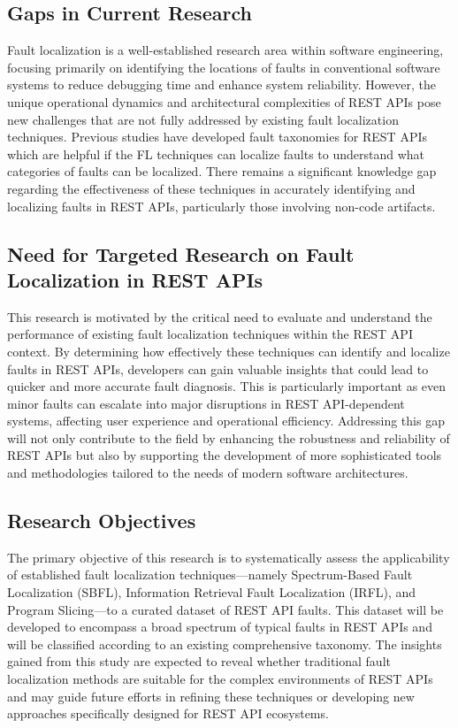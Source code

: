 \documentclass[conference]{IEEEtran}
\begin{document}
\subsection{Gaps in Current Research}
Fault localization is a well-established research area within software engineering, focusing primarily on identifying the locations of faults in conventional software systems to reduce debugging time and enhance system reliability.
 However, the unique operational dynamics and architectural complexities of REST APIs pose new challenges that are not fully addressed by existing fault localization techniques.
Previous studies have developed fault taxonomies for REST APIs which are helpful if the FL techniques can localize faults to understand what categories of faults can be localized.
There remains a significant knowledge gap regarding the effectiveness of these techniques in accurately identifying and localizing faults in REST APIs, particularly those involving non-code artifacts.


\subsection{Need for Targeted Research on Fault Localization in REST APIs}
This research is motivated by the critical need to evaluate and understand the performance of existing fault localization techniques within the REST API context. 
By determining how effectively these techniques can identify and localize faults in REST APIs, developers can gain valuable insights that could lead to quicker and more accurate fault diagnosis. This is particularly important as even minor faults can escalate into major disruptions in REST API-dependent systems, affecting user experience and operational efficiency. Addressing this gap will not only contribute to the field by enhancing the robustness and reliability of REST APIs but also by supporting the development of more sophisticated tools and methodologies tailored to the needs of modern software architectures.


\subsection{Research Objectives}
The primary objective of this research is to systematically assess the applicability of established fault localization techniques—namely 
Spectrum-Based Fault Localization (SBFL), Information Retrieval Fault Localization (IRFL), and Program Slicing—to a curated dataset of REST API faults. 
This dataset will be developed to encompass a broad spectrum of typical faults in REST APIs and will be classified according to an existing comprehensive taxonomy. 
The insights gained from this study are expected to reveal whether traditional fault localization methods are suitable for the complex environments of REST APIs and may guide future efforts in refining these techniques or developing new approaches specifically designed for REST API ecosystems.
\end{document}
